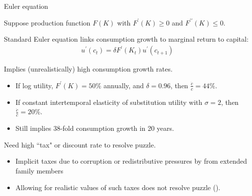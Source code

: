 \documentclass[aspectratio=169, 10pt, handout]{beamer}
\newenvironment{wideitemize}{\itemize\addtolength{\itemsep}{10pt}}{\enditemize}
\begin{document}
\begin{frame}{Euler equation} %

\begin{wideitemize}

	\item Suppose production function $F(K)$ with $F^{\prime} (K) \geq 0$ and $F^{\prime \prime} (K) \leq 0$.
	
	
	\item Standard Euler equation links consumption growth to marginal return to capital:
	\begin{align}
	u^{\prime} (c_t)= \delta F^{\prime}(K_t) u^{\prime} (c_{t+1})
	\end{align}

	\item Implies (unrealistically) high consumption growth rates.
	
	\begin{itemize}

		\item If log utility, $F^{\prime}(K ) =  50\%$ annually, and $\delta = 0.96$, then  $\frac{\dot{c}}{c} = 44\%$.

		\item If constant intertemporal elasticity of substitution utility with $\sigma = 2$, then $\frac{\dot{c}}{c} = 20\%$. 

		\item Still implies 38-fold consumption growth in 20 years. 
		
	\end{itemize}

	\item Need high ``tax" or discount rate to resolve puzzle.
		
	\begin{itemize}
	    
	    \item Implicit taxes due to corruption or redistributive pressures by from extended family members
	    
	    \item Allowing for realistic values of such taxes does not resolve puzzle (\cite{jakiela2015does}).
	    
	\end{itemize}

\end{wideitemize}




\end{frame}
\end{document}
